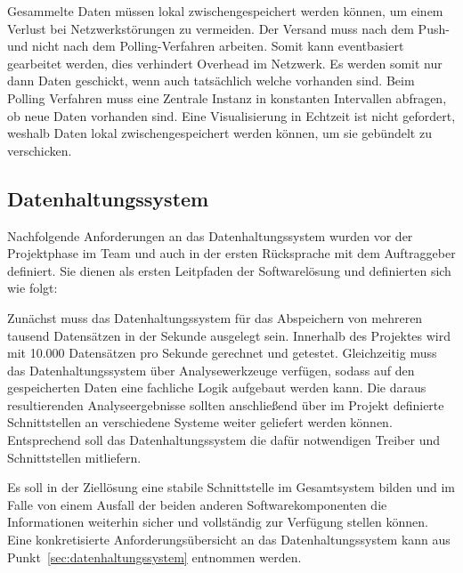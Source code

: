 Gesammelte Daten müssen lokal zwischengespeichert werden können, um einem
Verlust bei Netzwerkstörungen zu vermeiden. Der Versand muss nach dem Push- und
nicht nach dem Polling-Verfahren arbeiten. Somit kann eventbasiert gearbeitet
werden, dies verhindert Overhead im Netzwerk. Es werden somit nur dann Daten
geschickt, wenn auch tatsächlich welche vorhanden sind. Beim Polling Verfahren
muss eine Zentrale Instanz in konstanten Intervallen abfragen, ob neue Daten
vorhanden sind. Eine Visualisierung in Echtzeit ist nicht gefordert, weshalb
Daten lokal zwischengespeichert werden können, um sie gebündelt zu verschicken.
\tm%

\subsection{Datenhaltungssystem}
Nachfolgende Anforderungen an das Datenhaltungssystem wurden vor der
Projektphase im Team und auch in der ersten Rücksprache mit dem Auftraggeber
definiert. Sie dienen als ersten Leitpfaden der Softwarelösung und definierten
sich wie folgt:

\begin{outline}
  \1 Zunächst muss das Datenhaltungssystem für das Abspeichern von mehreren
  tausend Datensätzen in der Sekunde ausgelegt sein. Innerhalb des Projektes
  wird mit 10.000 Datensätzen pro Sekunde gerechnet und getestet.
  \1 Gleichzeitig muss das Datenhaltungssystem über Analysewerkzeuge verfügen,
  sodass auf den gespeicherten Daten eine fachliche Logik aufgebaut werden
  kann.
  \1 Die daraus resultierenden Analyseergebnisse sollten anschließend über im
  Projekt definierte Schnittstellen an verschiedene Systeme weiter geliefert
  werden können. Entsprechend soll das Datenhaltungssystem die dafür
  notwendigen Treiber und Schnittstellen mitliefern.
\end{outline}

Es soll in der Ziellösung eine stabile Schnittstelle im Gesamtsystem bilden
und im Falle von einem Ausfall der beiden anderen Softwarekomponenten die
Informationen weiterhin sicher und vollständig zur Verfügung stellen können.
Eine konkretisierte Anforderungsübersicht an das Datenhaltungssystem kann aus
Punkt~\ref{sec:datenhaltungssystem} entnommen werden.
\nl%

